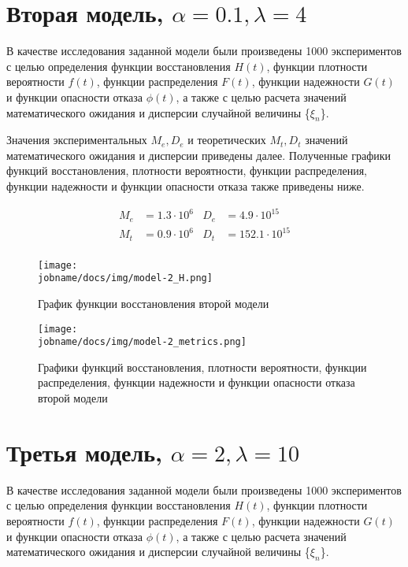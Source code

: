\clearpage

\section*{Вторая модель, $\alpha = 0.1, \lambda = 4$}

В качестве исследования заданной модели были произведены 1000 экспериментов с целью определения функции восстановления
$H(t)$, функции плотности вероятности $f(t)$, функции распределения $F(t)$, функции надежности $G(t)$ и функции
опасности отказа $\phi(t)$, а также с целью расчета значений математического ожидания и дисперсии
случайной величины \{$\xi_n$\}.

Значения экспериментальных  $M_e, D_e$ и теоретических $M_t, D_t$ значений математического ожидания и дисперсии
приведены далее.
Полученные графики функций восстановления, плотности вероятности, функции распределения, функции надежности и функции
опасности отказа также приведены ниже.

\begin{align*}
     M_e & = 1.3 \cdot 10 ^ 6 & D_e & = 4.9 \cdot 10 ^ {15} \\
     M_t & = 0.9 \cdot 10 ^ 6 & D_t & = 152.1 \cdot 10 ^ {15} \\
\end{align*}

\begin{figure}[h!]
    \centering
    \texttt{[image: \\jobname/docs/img/model-2\_H.png]}
    \caption{График функции восстановления второй модели}
\end{figure}

\begin{figure}[h!]
    \centering
    \texttt{[image: \\jobname/docs/img/model-2\_metrics.png]}
    \caption{Графики функций восстановления, плотности вероятности, функции распределения, функции надежности и функции
    опасности отказа второй модели}
\end{figure}

\clearpage

\section*{Третья модель, $\alpha = 2, \lambda = 10$}

В качестве исследования заданной модели были произведены 1000 экспериментов с целью определения функции восстановления
$H(t)$, функции плотности вероятности $f(t)$, функции распределения $F(t)$, функции надежности $G(t)$ и функции
опасности отказа $\phi(t)$, а также с целью расчета значений математического ожидания и дисперсии
случайной величины \{$\xi_n$\}.

